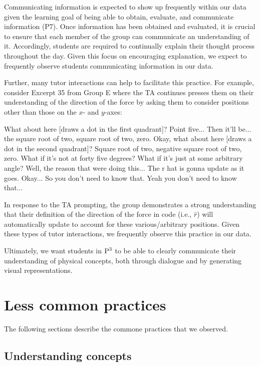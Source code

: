 \documentclass{msuphddissertation}
\begin{document}
\begin{doublespace}
\begin{appendices}
Communicating information is expected to show up frequently within our data given the learning goal of being able to obtain, evaluate, and communicate information (P7).  Once information has been obtained and evaluated, it is crucial to ensure that each member of the group can communicate an understanding of it.  Accordingly, students are required to continually explain their thought process throughout the day.  Given this focus on encouraging explanation, we expect to frequently observe students communicating information in our data.

Further, many tutor interactions can help to facilitate this practice.  For example, consider Excerpt 35 from Group E where the TA continues presses them on their understanding of the direction of the force by asking them to consider positions other than those on the $x$- and $y$-axes: \begin{description}
\TA What about here [draws a dot in the first quadrant]?
\SD Point five...
\SB Then it'll be... the square root of two, square root of two, zero.
\TA Okay, what about here [draws a dot in the second quadrant]?
\SB Square root of two, negative square root of two, zero.
\TA What if it's not at forty five degrees?
\TA What if it's just at some arbitrary angle?
\SB Well, the reason that were doing this...      
\SD The r hat is gonna update as it goes.
\TA Okay...
\SD So you don’t need to know that.
\SB Yeah you don’t need {to know that}...   
\end{description}  In response to the TA prompting, the group demonstrates a strong understanding that their definition of the direction of the force in code (i.e., $\hat{r}$) will automatically update to account for these various/arbitrary positions.  Given these types of tutor interactions, we frequently observe this practice in our data.

Ultimately, we want students in ${\rm P}^{3}$ to be able to clearly communicate their understanding of physical concepts, both through dialogue and by generating visual representations.

\chapter{Less common practices}\label{app:less}

The following sections describe the commone practices that we observed.

\section*{Understanding concepts}


\end{appendices}
\end{doublespace}
\end{document}
